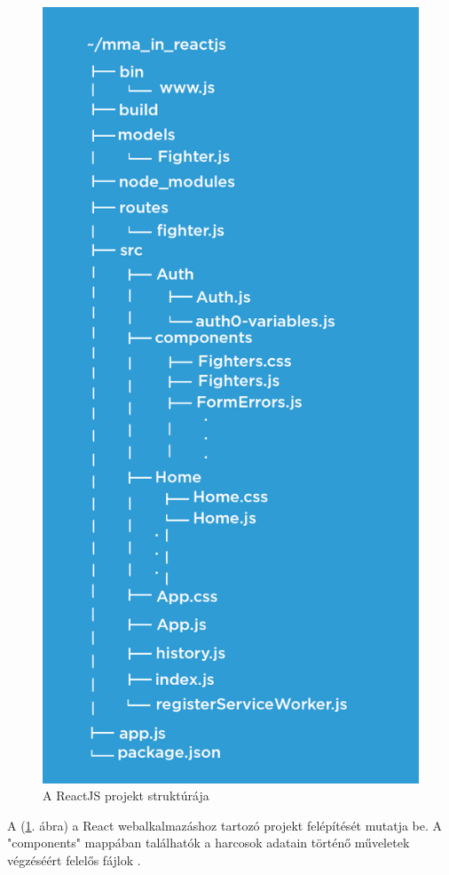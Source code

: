 \begin{figure}[htb]
\centering
\includegraphics[scale=0.7]{kepek/mma_in_reactjs.jpeg}
\caption{A ReactJS projekt struktúrája}
\label{fig:reactjs_structure}
\end{figure}


A (\ref{fig:reactjs_structure}. ábra) a React webalkalmazáshoz tartozó projekt felépítését mutatja be. A "components" mappában találhatók a harcosok adatain történő műveletek végzéséért felelős fájlok \cite{React könyv} \cite{React oldal}.

